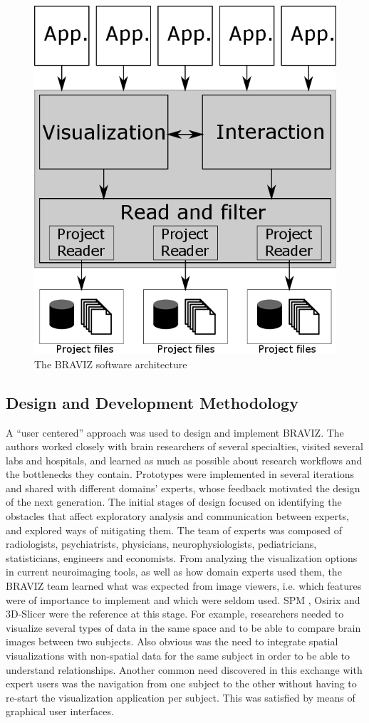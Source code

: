 \documentclass[twocolumn]{svjour3}
\begin{document}
\begin{figure}
\begin{center}
\includegraphics[width=0.6\linewidth]{figures/arquitecture.png}
\end{center}
 \caption{\label{fig_arch} The BRAVIZ software architecture}
\end{figure}


\subsection{Design and Development Methodology}

A ``user centered'' approach \cite{wassink_applying_2009} was used to design and implement BRAVIZ. The authors worked closely with brain researchers of several specialties, visited several labs and hospitals, and learned as much as possible about research workflows and the bottlenecks they contain. Prototypes were implemented in several iterations and shared with different domains’ experts, whose feedback motivated the design of the next generation.
The initial stages of design focused on identifying the obstacles that affect exploratory analysis and communication between experts, and explored ways of mitigating them. The team of experts was composed of radiologists, psychiatrists, physicians, neurophysiologists, pediatricians, statisticians, engineers and economists.
From analyzing the visualization options in current neuroimaging tools, as well as how domain experts used them, the BRAVIZ team learned what was expected from image viewers, i.e. which features were of importance to implement and which were seldom used. SPM \cite{friston_statistical_2007}, Osirix \cite{rosset_osirix:_2004} and 3D-Slicer \cite{fedorov_3d_2012} were the reference at this stage. For example, researchers needed to visualize several types of data in the same space and to be able to compare brain images between two subjects. Also obvious was the need to integrate spatial visualizations with non-spatial data for the same subject in order to be able to understand relationships. Another common need discovered in this exchange with expert users was the navigation from one subject to the other without having to re-start the visualization application per subject. This was satisfied by means of graphical user interfaces.
\end{document}

